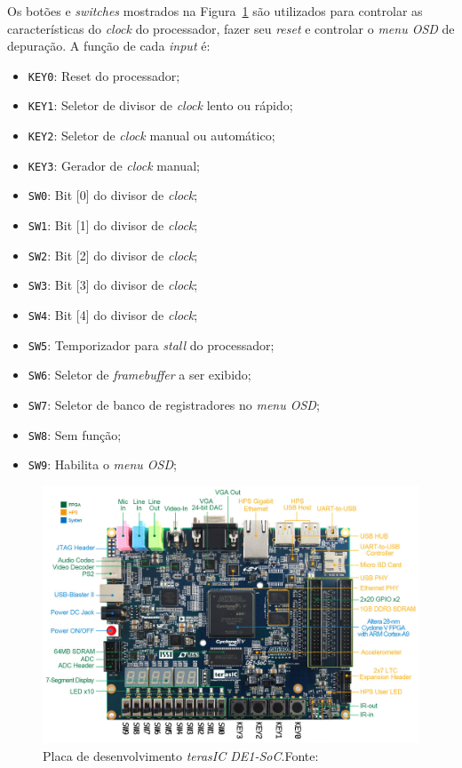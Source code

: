     { Os botões e \textit{switches} mostrados na Figura~\ref{fig:de1_soc} são
        utilizados para controlar as características do \textit{clock} do
        processador, fazer seu \textit{reset} e controlar o \textit{menu OSD}
        de depuração. A função de cada \textit{input} é:
    }
    \begin{itemize}
        \setlength\itemsep{0em}
        \item \texttt{KEY0}: Reset do processador;
        \item \texttt{KEY1}: Seletor de divisor de \textit{clock} lento ou rápido;
        \item \texttt{KEY2}: Seletor de \textit{clock} manual ou automático;
        \item \texttt{KEY3}: Gerador de \textit{clock} manual;
        \item \texttt{SW0}: Bit [0] do divisor de \textit{clock};
        \item \texttt{SW1}: Bit [1] do divisor de \textit{clock};
        \item \texttt{SW2}: Bit [2] do divisor de \textit{clock};
        \item \texttt{SW3}: Bit [3] do divisor de \textit{clock};
        \item \texttt{SW4}: Bit [4] do divisor de \textit{clock};
        \item \texttt{SW5}: Temporizador para \textit{stall} do processador;
        \item \texttt{SW6}: Seletor de \textit{framebuffer} a ser exibido;
        \item \texttt{SW7}: Seletor de banco de registradores no \textit{menu OSD};
        \item \texttt{SW8}: Sem função;
        \item \texttt{SW9}: Habilita o \textit{menu OSD};
    \end{itemize}

    \begin{figure}[H]
    \centering
        \includegraphics[width=.9\linewidth]{../images/fpga/de1_soc_subs.png}
        \caption[Placa de desenvolvimento \textit{terasIC DE1-SoC}.]{Placa de
        desenvolvimento \textit{terasIC DE1-SoC}.\quad Fonte:~\cite{terasic_de1_soc}}
        \label{fig:de1_soc}
    \end{figure}

